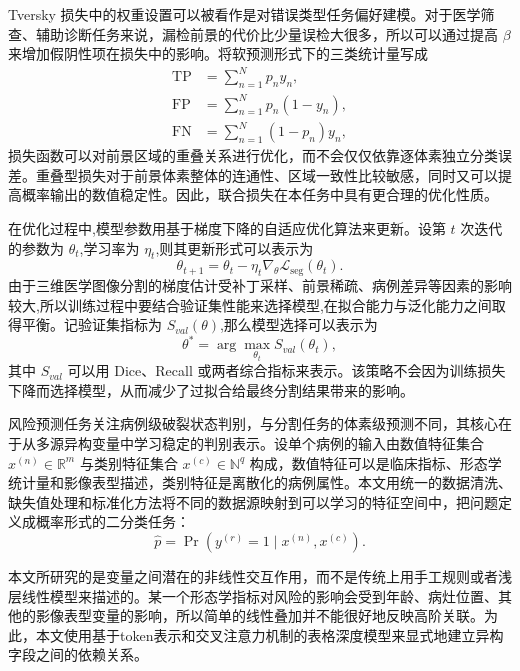 Tversky 损失中的权重设置可以被看作是对错误类型任务偏好建模。对于医学筛查、辅助诊断任务来说，漏检前景的代价比少量误检大很多，所以可以通过提高 $\beta$ 来增加假阴性项在损失中的影响。将软预测形式下的三类统计量写成
\begin{equation}
\begin{aligned}
\mathrm{TP}&=\sum_{n=1}^{N}p_ny_n,\\
\mathrm{FP}&=\sum_{n=1}^{N}p_n(1-y_n),\\
\mathrm{FN}&=\sum_{n=1}^{N}(1-p_n)y_n,
\end{aligned}
\label{eq:seg-tp-fp-fn}
\end{equation}
损失函数可以对前景区域的重叠关系进行优化，而不会仅仅依靠逐体素独立分类误差。重叠型损失对于前景体素整体的连通性、区域一致性比较敏感，同时又可以提高概率输出的数值稳定性。因此，联合损失在本任务中具有更合理的优化性质。

在优化过程中,模型参数用基于梯度下降的自适应优化算法来更新。设第 $t$ 次迭代的参数为 $\theta_t$,学习率为 $\eta_t$,则其更新形式可以表示为
\begin{equation}
\theta_{t+1}=\theta_t-\eta_t\nabla_{\theta}\mathcal{L}_{\mathrm{seg}}(\theta_t).
\label{eq:param-update}
\end{equation}
由于三维医学图像分割的梯度估计受补丁采样、前景稀疏、病例差异等因素的影响较大,所以训练过程中要结合验证集性能来选择模型,在拟合能力与泛化能力之间取得平衡。记验证集指标为 $S_{val}(\theta)$,那么模型选择可以表示为
\begin{equation}
\theta^{\ast}=\arg\max_{\theta_t}S_{val}(\theta_t),
\label{eq:model-selection}
\end{equation}
其中 $S_{val}$ 可以用 Dice、Recall 或两者综合指标来表示。该策略不会因为训练损失下降而选择模型，从而减少了过拟合给最终分割结果带来的影响。

风险预测任务关注病例级破裂状态判别，与分割任务的体素级预测不同，其核心在于从多源异构变量中学习稳定的判别表示。设单个病例的输入由数值特征集合 $x^{(n)}\in\mathbb{R}^{m}$ 与类别特征集合 $x^{(c)}\in\mathbb{N}^{q}$ 构成，数值特征可以是临床指标、形态学统计量和影像表型描述，类别特征是离散化的病例属性。本文用统一的数据清洗、缺失值处理和标准化方法将不同的数据源映射到可以学习的特征空间中，把问题定义成概率形式的二分类任务：
\begin{equation}
\hat{p}=\Pr(y^{(r)}=1\mid x^{(n)},x^{(c)}).
\label{eq:risk-prob-def}
\end{equation}

本文所研究的是变量之间潜在的非线性交互作用，而不是传统上用手工规则或者浅层线性模型来描述的。某一个形态学指标对风险的影响会受到年龄、病灶位置、其他的影像表型变量的影响，所以简单的线性叠加并不能很好地反映高阶关联。为此，本文使用基于token表示和交叉注意力机制的表格深度模型来显式地建立异构字段之间的依赖关系。

